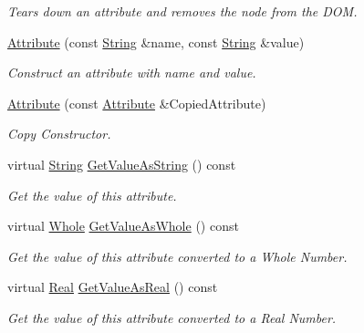 \begin{DoxyCompactItemize}
\begin{DoxyCompactList}\small\item\em Tears down an attribute and removes the node from the DOM. \item\end{DoxyCompactList}\item 
\hyperlink{classphys_1_1xml_1_1Attribute_abce6652f3a2ca2cf5a5d46b7ceb1e108}{Attribute} (const \hyperlink{namespacephys_aa03900411993de7fbfec4789bc1d392e}{String} \&name, const \hyperlink{namespacephys_aa03900411993de7fbfec4789bc1d392e}{String} \&value)
\begin{DoxyCompactList}\small\item\em Construct an attribute with name and value. \item\end{DoxyCompactList}\item 
\hyperlink{classphys_1_1xml_1_1Attribute_a9c40a881b9b8ebe24f68a7fb30dbb581}{Attribute} (const \hyperlink{classphys_1_1xml_1_1Attribute}{Attribute} \&CopiedAttribute)
\begin{DoxyCompactList}\small\item\em Copy Constructor. \item\end{DoxyCompactList}\item 
virtual \hyperlink{namespacephys_aa03900411993de7fbfec4789bc1d392e}{String} \hyperlink{classphys_1_1xml_1_1Attribute_a4233cbb30f70b0227b154eec519dd6df}{GetValueAsString} () const 
\begin{DoxyCompactList}\small\item\em Get the value of this attribute. \item\end{DoxyCompactList}\item 
virtual \hyperlink{namespacephys_a460f6bc24c8dd347b05e0366ae34f34a}{Whole} \hyperlink{classphys_1_1xml_1_1Attribute_ab9da0640573f91650665aa78fc9b1913}{GetValueAsWhole} () const 
\begin{DoxyCompactList}\small\item\em Get the value of this attribute converted to a Whole Number. \item\end{DoxyCompactList}\item 
virtual \hyperlink{namespacephys_af7eb897198d265b8e868f45240230d5f}{Real} \hyperlink{classphys_1_1xml_1_1Attribute_ad95b5d6390192c370432221bb8fab7f9}{GetValueAsReal} () const 
\begin{DoxyCompactList}\small\item\em Get the value of this attribute converted to a Real Number. \item\end{DoxyCompactList}\item 

\end{DoxyCompactItemize}

